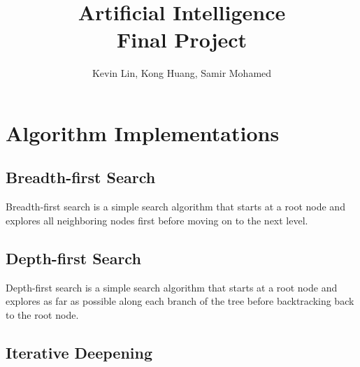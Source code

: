 \documentclass[a4paper,oneside,10pt]{report}
\begin{document}
\pagestyle{empty} %



\title{Artificial Intelligence \\ Final Project}
\author{Kevin Lin, Kong Huang, Samir Mohamed}
\maketitle



\tableofcontents %
\cleardoublepage %

\pagestyle{plain} %


\setcounter{page}{1}

\chapter{Algorithm Implementations}\label{implementations}

\section{Breadth-first Search}\label{breadth}

Breadth-first search is a simple search algorithm that starts at a root node and explores all neighboring nodes first before moving on to the next level.

\section{Depth-first Search}\label{depth}

Depth-first search is a simple search algorithm that starts at a root node and explores as far as possible along each branch of the tree before backtracking back to the root node. 

\section{Iterative Deepening}\label{iterative}
\end{document}
